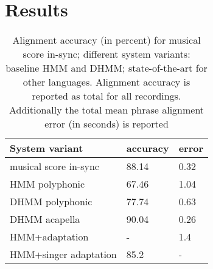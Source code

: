 \documentclass{article}
\begin{document}
\textcolor{red}{}




\section{Results}

\begin{table}
\begin{centering}
{\small{} }%
\begin{tabular}{|l|l|l|}
\hline 
\textbf{\small{}System variant} & \textbf{\small{} }\linebreak\textbf{\small{ } accuracy}{\small{} } & \textbf{\small{}}\linebreak\textbf{\small{} error}{\small{} }\tabularnewline
\hline 
musical score in-sync & 88.14 & 0.32\tabularnewline
\hline 
HMM polyphonic & 67.46 & 1.04\tabularnewline
DHMM polyphonic & 77.74 & 0.63\tabularnewline
DHMM acapella & 90.04 & 0.26\tabularnewline
\hline 
HMM+adaptation \cite{Mesaros96automaticalignment} & - & 1.4\tabularnewline
HMM+\linebreak singer adaptation \cite{fujihara2011lyricsynchronizer} & 85.2 & -\tabularnewline
\hline 
\end{tabular}
\par\end{centering}{\small \par}

{\small{}\vspace*{-0.3cm}
 \protect\caption{Alignment accuracy (in percent) for musical score in-sync; different
system variants: baseline HMM and DHMM; state-of-the-art for other
languages. Alignment accuracy is reported as total for all recordings.
Additionally the total mean phrase alignment error (in seconds) is
reported}
}{\small \par}

\label{resultsTable}
\end{table}
\end{document}
